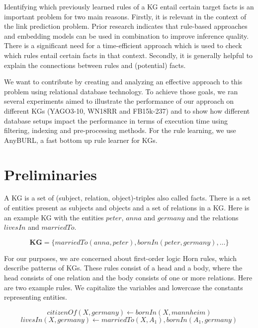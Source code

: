 \documentclass[english]{lni}
\begin{document}
Identifying which previously learned rules of a KG entail certain target facts is an important problem for two main reasons. Firstly, it is relevant in the context of the link prediction problem. Prior research indicates that rule-based approaches and embedding models can be used in combination to improve inference quality.\cite{RuleEmbeddingCombination1}\cite{RuleEmbeddingCombination2} There is a significant need for a time-efficient approach which is used to check which rules entail certain facts in that context. Secondly, it is generally helpful to explain the connections between rules and (potential) facts.


We want to contribute by creating and analyzing an effective approach to this problem using relational database technology. To achieve those goals, we ran several experiments aimed to illustrate the performance of our approach on different KGs (YAGO3-10, WN18RR and FB15k-237) and to show how different database setups impact the performance in terms of execution time using filtering, indexing and pre-processing methods. For the rule learning, we use AnyBURL, a fast bottom up rule learner for KGs.\cite{AnyBURL19}

\section{Preliminaries} 
A KG is a set of (subject, relation, object)-triples also called facts. There is a set of entities present as subjects and objects and a set of relations in a KG. Here is an example KG with the entities \(peter\), \(anna\) and \(germany\) and the relations \(livesIn\) and \(marriedTo\).

\[\textbf{KG} = \{marriedTo(anna, peter), bornIn(peter, germany), …\}\]

For our purposes, we are concerned about first-order logic Horn rules, which describe patterns of KGs. These rules consist of a head and a body, where the head consists of one relation and the body consists of one or more relations. Here are two example rules. We capitalize the variables and lowercase the constants representing entities.

\begin{equation} \label{eq:rule_1}
citizenOf(X, germany) \leftarrow bornIn(X, mannheim) 
\end{equation} \label{eq:rule_2}
\begin{equation}
livesIn(X, germany) \leftarrow marriedTo(X, A_1), bornIn(A_1, germany)
\end{equation}
\end{document}

